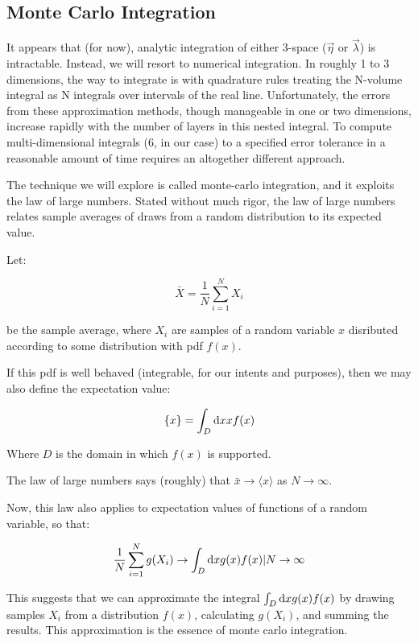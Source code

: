 \documentclass[10pt,letterpaper]{article}
\def\d{{\rm d}}  %
\begin{document}
\subsection{Monte Carlo Integration}

It appears that (for now), analytic integration of either 3-space ($\vec{\eta}$ or $\vec{\lambda}$) is intractable. Instead, we will resort to numerical integration. In roughly 1 to 3 dimensions, the way to integrate is with quadrature rules treating the N-volume integral as N integrals over intervals of the real line. Unfortunately, the errors from these approximation methods, though manageable in one or two dimensions, increase rapidly with the number of layers in this nested integral. To compute multi-dimensional integrals (6, in our case) to a specified error tolerance in a reasonable amount of time requires an altogether different approach.

The technique we will explore is called monte-carlo integration, and it exploits the law of large numbers.
Stated without much rigor, the law of large numbers relates sample averages of draws from a random distribution to its expected value.

Let:

$$\bar{X} = \displaystyle{\frac{1}{N}} \sum_{i=1}^N X_i$$

be the sample average, where $X_i$ are samples of a random variable $x$ disributed according to some distribution with pdf $f(x)$.

If this pdf is well behaved (integrable, for our intents and purposes), then we may also define the expectation value:

$$\lbrace x \rbrace = \int_{D} \d x x f(x)$$

Where $D$ is the domain in which $f(x)$ is supported.

The law of large numbers says (roughly) that $\bar{x} \rightarrow \langle x \rangle$ as $N \rightarrow \infty$.

Now, this law also applies to expectation values of functions of a random variable, so that:

\begin{equation} \label{eq:largen_func}
\displaystyle{\frac{1}{N}} \sum_{i=1}^N g(X_i) \rightarrow \int_{D} \d x g(x) f(x) | N \rightarrow \infty
\end{equation}

This suggests that we can approximate the integral $\int_{D} \d x g(x) f(x)$ by drawing samples $X_i$ from a distribution $f(x)$, calculating $g(X_i)$, and summing the results. This approximation is the essence of monte carlo integration.
\end{document}
